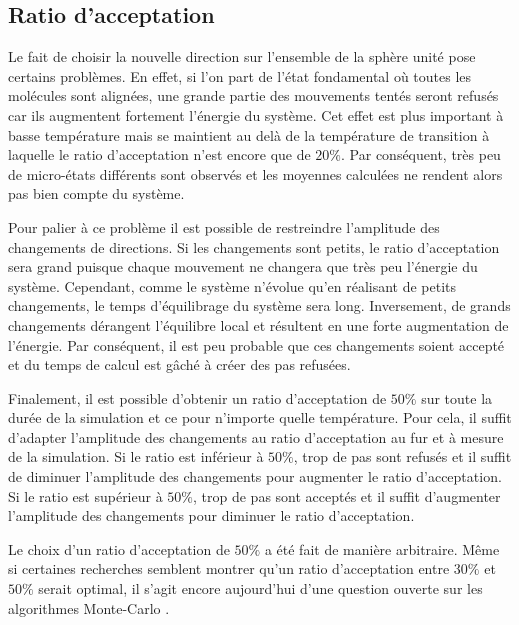 \documentclass[11pt,a4paper]{article}
\numberwithin{equation}{section}
\begin{document}
\subsection{Ratio d'acceptation}
Le fait de choisir la nouvelle direction sur l'ensemble de la sphère unité pose certains problèmes. En effet, si l'on part de l'état fondamental où toutes les molécules sont alignées, une grande partie des mouvements tentés seront refusés car ils augmentent fortement l'énergie du système. Cet effet est plus important à basse température mais se maintient au delà de la température de transition à laquelle le ratio d'acceptation n'est encore que de $20\%$. Par conséquent, très peu de micro-états différents sont observés et les moyennes calculées ne rendent alors pas bien compte du système.
\medskip

Pour palier à ce problème il est possible de restreindre l'amplitude des changements de directions. Si les changements sont petits, le ratio d'acceptation sera grand puisque chaque mouvement ne changera que très peu l'énergie du système. Cependant, comme le système n'évolue qu'en réalisant de petits changements, le temps d'équilibrage du système sera long. Inversement, de grands changements dérangent l'équilibre local et résultent en une forte augmentation de l'énergie. Par conséquent, il est peu probable que ces changements soient accepté et du temps de calcul est gâché à créer des pas refusées.
\medskip

Finalement, il est possible d'obtenir un ratio d'acceptation de $50\%$ sur toute la durée de la simulation et ce pour n'importe quelle température. Pour cela, il suffit d'adapter l'amplitude des changements au ratio d'acceptation au fur et à mesure de la simulation. Si le ratio est inférieur à $50\%$, trop de pas sont refusés et il suffit de diminuer l'amplitude des changements pour augmenter le ratio d'acceptation. Si le ratio est supérieur à $50\%$, trop de pas sont acceptés et il suffit d'augmenter l'amplitude des changements pour diminuer le ratio d'acceptation. 
\medskip

Le choix d'un ratio d'acceptation de $50\%$ a été fait de manière arbitraire. Même si certaines recherches \cite{acceptanceratio} semblent montrer qu'un ratio d'acceptation entre $30\%$ et $50\%$ serait optimal, il s'agit encore aujourd'hui d'une question ouverte sur les algorithmes Monte-Carlo \cite{acceptanceratio1}.
\end{document}
